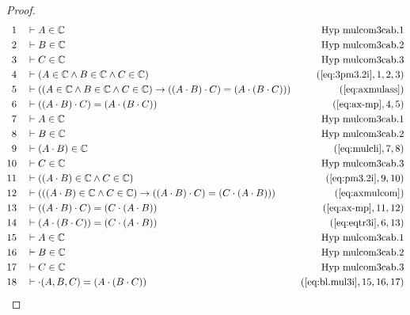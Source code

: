 \begin{proof}
\begin{align}
  1 &&  & \vdash A \in \mathbb{C}&\text{Hyp~mulcom3cab.1}\notag%
  \\ 2 &&  & \vdash B \in
\mathbb{C}&\text{Hyp~mulcom3cab.2}\notag%
  \\ 3 &&  & \vdash C \in
\mathbb{C}&\text{Hyp~mulcom3cab.3}\notag%
  \\ 4 &&  & \vdash ( A \in \mathbb{C} \wedge B \in \mathbb{C} \wedge C \in \mathbb{C} )&(\mbox{\ref{eq:3pm3.2i}},1,2,3)\notag
  \\ 5 &&  & \vdash ( ( A \in \mathbb{C} \wedge B \in \mathbb{C} \wedge C \in \mathbb{C} ) \rightarrow ( ( A \cdot B ) \cdot C ) = ( A \cdot ( B \cdot C ) ) )&(\mbox{\ref{eq:axmulass}})\notag
  \\ 6 &&  & \vdash ( ( A \cdot B ) \cdot C ) = ( A \cdot ( B \cdot C ) )&(\mbox{\ref{eq:ax-mp}},4,5)\notag
  \\ 7 &&  & \vdash A \in
\mathbb{C}&\text{Hyp~mulcom3cab.1}\notag%
  \\ 8 &&  & \vdash B \in
\mathbb{C}&\text{Hyp~mulcom3cab.2}\notag%
  \\ 9 &&  & \vdash ( A \cdot B ) \in \mathbb{C}&(\mbox{\ref{eq:mulcli}},7,8)\notag
  \\ 10 &&  & \vdash C \in
\mathbb{C}&\text{Hyp~mulcom3cab.3}\notag%
  \\ 11 &&  & \vdash ( ( A \cdot B ) \in \mathbb{C} \wedge C \in \mathbb{C} )&(\mbox{\ref{eq:pm3.2i}},9,10)\notag
  \\ 12 &&  & \vdash ( ( ( A \cdot B ) \in \mathbb{C} \wedge C \in \mathbb{C} ) \rightarrow ( ( A \cdot B ) \cdot C ) = ( C \cdot ( A \cdot B ) ) )&(\mbox{\ref{eq:axmulcom}})\notag
  \\ 13 &&  & \vdash ( ( A \cdot B ) \cdot C ) = ( C \cdot ( A \cdot B ) )&(\mbox{\ref{eq:ax-mp}},11,12)\notag
  \\ 14 &&  & \vdash ( A \cdot ( B \cdot C ) ) = ( C \cdot ( A \cdot B ) )&(\mbox{\ref{eq:eqtr3i}},6,13)\notag
  \\ 15 &&  & \vdash A \in
\mathbb{C}&\text{Hyp~mulcom3cab.1}\notag%
  \\ 16 &&  & \vdash B \in
\mathbb{C}&\text{Hyp~mulcom3cab.2}\notag%
  \\ 17 &&  & \vdash C \in
\mathbb{C}&\text{Hyp~mulcom3cab.3}\notag%
  \\ 18 &&  & \vdash \cdot( A , B , C ) = ( A \cdot ( B \cdot C ) )&(\mbox{\ref{eq:bl.mul3i}},15,16,17)\notag

\end{align}
\end{proof}
